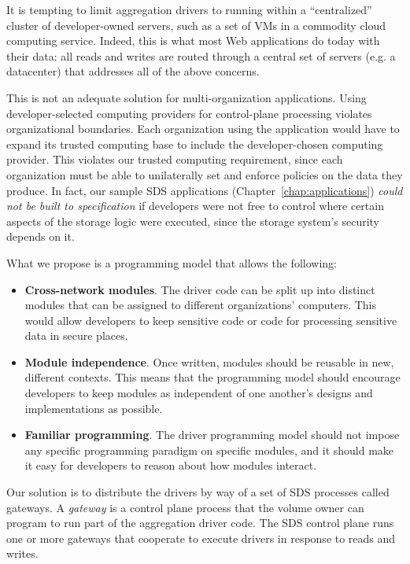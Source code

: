 It is tempting to limit aggregation drivers to
running within a ``centralized'' cluster of developer-owned servers,
such as a set of VMs in a commodity cloud computing service.  Indeed, this is
what most Web applications do today with their data:  all reads and writes are routed through a
central set of servers (e.g. a datacenter) that addresses all of the above
concerns.

This is not an adequate solution for multi-organization applications.
Using developer-selected computing providers for control-plane processing
violates organizational boundaries.  Each organization using the application
would have to expand its trusted computing base to include the developer-chosen
computing provider.  This violates our trusted computing requirement, since each
organization must be able to unilaterally set and enforce policies on the data
they produce.  In fact, our sample SDS applications
(Chapter~\ref{chap:applications}) \emph{could not be built to specification} if
developers were not free to control where certain aspects of the storage logic
were executed, since the storage system's security depends on it.


What we propose is a programming model that allows the following:

\begin{itemize}
   \item \textbf{Cross-network modules}.  The driver code
      can be split up into distinct modules that can be
      assigned to different organizations' computers.  This would allow
      developers to keep sensitive code or code for processing sensitive data
      in secure places.
   \item \textbf{Module independence}.  Once written, modules should be reusable in 
      new, different contexts.  This means that the programming model should
      encourage developers to keep modules as independent of one another's
      designs and implementations as possible.
   \item \textbf{Familiar programming}.  The driver programming model
      should not impose any specific programming paradigm on specific modules,
      and it should make it easy for developers to reason about how modules
      interact.
\end{itemize}

Our solution is to distribute the drivers by way of a set of SDS processes called gateways.
A \emph{gateway} is a control plane process that the
volume owner can program to run part of the aggregation driver code.  The SDS control plane
runs one or more gateways that cooperate to execute drivers in response
to reads and writes.

